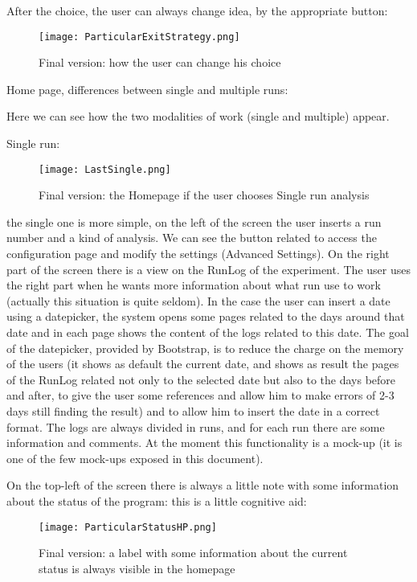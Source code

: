 After the choice, the user can always change idea, by the appropriate button:

\begin{figure}[H]
\centering
\texttt{[image: ParticularExitStrategy.png]} 
\caption{Final version: how the user can change his choice}
\end{figure}

\newpage
Home page, differences between single and multiple runs:

Here we can see how the two modalities of work (single and multiple) appear.

Single run: 
\begin{figure}[H]
\centering
\texttt{[image: LastSingle.png]} 
\caption{Final version: the Homepage if the user chooses Single run analysis}
\end{figure}

the single one is more simple, on the left of the screen the user inserts a run number and a kind of analysis. We can see the button related to access the configuration page and modify the settings (Advanced Settings). On the right part of the screen there is a view on the RunLog of the experiment. The user uses the right part when he wants more information about what run use to work (actually this situation is quite seldom). In the case the user can insert a date using a datepicker, the system opens some pages related to the days around that date and in each page shows the content of the logs related to this date. The goal of the datepicker, provided by Bootstrap, is to reduce the charge on the memory of the users (it shows as default the current date, and shows as result the pages of the RunLog related not only to the selected date but also to the days before and after, to give the user some references and allow him to make errors of 2-3 days still finding the result) and to allow him to insert the date in a correct format. The logs are always divided in runs, and for each run there are some information and comments. At the moment this functionality is a mock-up (it is one of the few  mock-ups exposed in this document). 

On the top-left of the screen there is always a little note with some information about the status of the program: this is a little cognitive aid:


\begin{figure}[H]
\centering
\texttt{[image: ParticularStatusHP.png]} 
\caption{Final version: a label with some information about the current status is always visible in the homepage}
\end{figure}    
 


